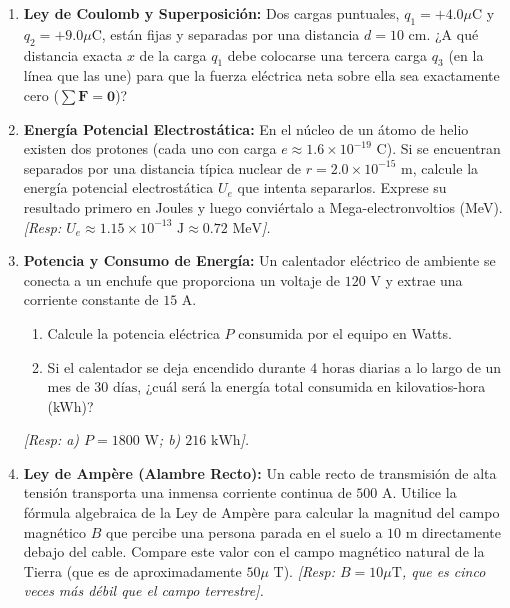 \documentclass[11pt,a4paper]{book}
\begin{document}
\begin{enumerate}

    \item 
    \textbf{Ley de Coulomb y Superposición:} Dos cargas puntuales, $q_1 = +4.0  \mu\text{C}$ y $q_2 = +9.0 \mu\text{C}$, están fijas y separadas por una distancia $d = 10 \text{ cm}$. ¿A qué distancia exacta $x$ de la carga $q_1$ debe colocarse una tercera carga $q_3$ (en la línea que las une) para que la fuerza eléctrica neta sobre ella sea exactamente cero ($\sum \boldsymbol{F} = \boldsymbol{0}$)?

    \item \textbf{Energía Potencial Electrostática:} En el núcleo de un átomo de helio existen dos protones (cada uno con carga $e \approx 1.6 \times 10^{-19} \text{ C}$). Si se encuentran separados por una distancia típica nuclear de $r = 2.0 \times 10^{-15} \text{ m}$, calcule la energía potencial electrostática $U_e$ que intenta separarlos. Exprese su resultado primero en Joules y luego conviértalo a Mega-electronvoltios (MeV).
    \textit{[Resp: $U_e \approx 1.15 \times 10^{-13} \text{ J} \approx 0.72 \text{ MeV}$].}

    \item \textbf{Potencia y Consumo de Energía:} Un calentador eléctrico de ambiente se conecta a un enchufe que proporciona un voltaje de $120 \text{ V}$ y extrae una corriente constante de $15 \text{ A}$. 
    \begin{enumerate}
        \item Calcule la potencia eléctrica $P$ consumida por el equipo en Watts.
        \item Si el calentador se deja encendido durante $4 \text{ horas}$ diarias a lo largo de un mes de $30 \text{ días}$, ¿cuál será la energía total consumida en kilovatios-hora (kWh)?
    \end{enumerate}
    \textit{[Resp: a) $P = 1800 \text{ W}$; b) $216 \text{ kWh}$].}

    \item \textbf{Ley de Ampère (Alambre Recto):} Un cable recto de transmisión de alta tensión transporta una inmensa corriente continua de $500 \text{ A}$. Utilice la fórmula algebraica de la Ley de Ampère para calcular la magnitud del campo magnético $B$ que percibe una persona parada en el suelo a $10 \text{ m}$ directamente debajo del cable. Compare este valor con el campo magnético natural de la Tierra (que es de aproximadamente $50 \mu\text{  T}$).
    \textit{[Resp: $B = 10 \mu\text{T}$, que es cinco veces más débil que el campo terrestre].}


\end{enumerate}
\end{document}
